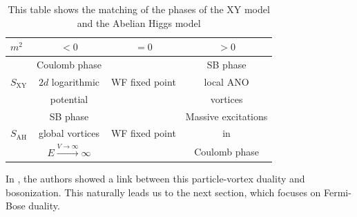     \begin{table}
\begin{center}
  \begin{tabular}{| l | c | c | c|}
      \hline
    $m^2$ & $<0$ & $=0$ & $>0$\\ \hline
     & Coulomb phase &  & SB phase\\ 
    $S_{\text{XY}}$ & $2d$ logarithmic & WF fixed point & local ANO \\ 
     & potential &  & vortices \\ \hline
      & SB phase &  &  Massive excitations\\
    $S_{\text{AH}}$ & global vortices & WF fixed point & in\\
      & $E\xrightarrow{V \rightarrow \infty} \infty$ &  & Coulomb phase \\
    \hline
  \end{tabular}
\end{center}
      \caption{This table shows the matching of the phases of the XY model and the Abelian Higgs model}
        \label{table:PV_Duality}
    \end{table}
In \cite{Karch:2016sxi}, the authors showed a link between this particle-vortex duality and bosonization. This naturally leads us to the next section, which focuses on Fermi-Bose duality.


%

